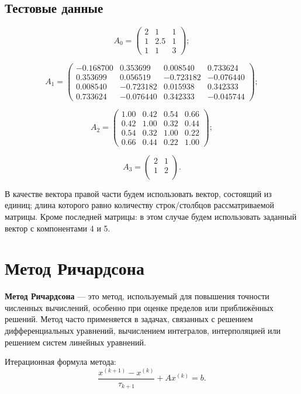 \documentclass[a4paper,12pt]{article}
\begin{document}
	\subsection{Тестовые данные}
	\[
	A_0 =
	\begin{pmatrix}
		2 & 1 & 1 \\
		1 & 2.5 & 1 \\
		1 & 1 & 3
	\end{pmatrix};
	\]
	
	\[
	A_1 =
	\begin{pmatrix}
		-0.168700 & 0.353699 & 0.008540 & 0.733624 \\
		0.353699 & 0.056519 & -0.723182 & -0.076440 \\
		0.008540 & -0.723182 & 0.015938 & 0.342333 \\
		0.733624 & -0.076440 & 0.342333 & -0.045744
	\end{pmatrix};
	\]
	
	\[
	A_2 =
	\begin{pmatrix}
		1.00 & 0.42 & 0.54 & 0.66 \\
		0.42 & 1.00 & 0.32 & 0.44 \\
		0.54 & 0.32 & 1.00 & 0.22 \\
		0.66 & 0.44 & 0.22 & 1.00
	\end{pmatrix};
	\]
	
	\[A_3 = 
	\begin{pmatrix}
		2 & 1\\
		1 & 2\\
	\end{pmatrix}.
	\]
	
	В качестве вектора правой части будем использовать вектор, состоящий из единиц; длина которого равно количеству строк/столбцов рассматриваемой матрицы. Кроме последней матрицы: в этом случае будем использовать заданный вектор с компонентами 4 и 5.
	
	\newpage
	
	\section{Метод Ричардсона}
	\textbf{Метод Ричардсона\cite{cm}} — это метод, используемый для повышения точности численных вычислений, особенно при оценке пределов или приближённых решений. Метод часто применяется в задачах, связанных с решением дифференциальных уравнений, вычислением интегралов, интерполяцией или решением систем линейных уравнений.
	
	Итерационная формула метода:
	\[
		\frac{x^{(k+1)} - x ^{(k)}}{\tau_{k+1}}  + A x^{(k)}= b. 
	\]
	
\end{document}
